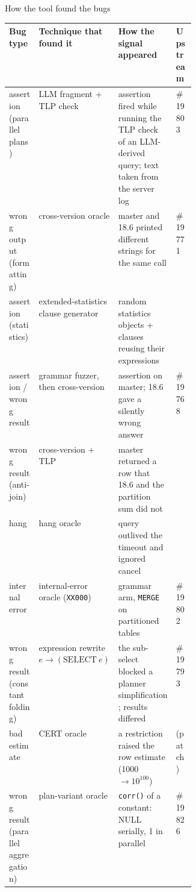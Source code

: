 \documentclass[aspectratio=169,10pt]{beamer}
\begin{document}
\begin{frame}{How the tool found the \pg bugs}
\scriptsize
\begin{tabularx}{\linewidth}{@{}L{0.16\linewidth}L{0.2\linewidth}Yl@{}}
\toprule
Bug type & Technique that found it & How the signal appeared & Upstream \\
\midrule
assertion (parallel plans) & LLM fragment + TLP check & assertion fired while running the TLP check of an LLM-derived query; text taken from the server log &  \#19803 \\
wrong output (formatting) & cross-version oracle & master and 18.6 printed different strings for the same call &  \#19771 \\
assertion (statistics) & extended-statistics clause generator & random statistics objects + clauses reusing their expressions &  \\
assertion / wrong result & grammar fuzzer, then cross-version & assertion on master; 18.6 gave a silently wrong answer &  \#19768 \\
wrong result (anti-join) & cross-version + TLP & master returned a row that 18.6 and the partition sum did not &  \\
hang & hang oracle & query outlived the timeout and ignored cancel &  \\
internal error & internal-error oracle (\texttt{XX000}) & grammar arm, \texttt{MERGE} on partitioned tables &  \#19802 \\
wrong result (constant folding) & expression rewrite $e\rightarrow(\mathrm{SELECT}\ e)$ & the sub-select blocked a planner simplification; results differed &  \#19793 \\
bad estimate & CERT oracle & a restriction raised the row estimate (1000 $\rightarrow 10^{100}$) &  (patch) \\
wrong result (parallel aggregation) & plan-variant oracle & \texttt{corr()} of a constant: NULL serially, 1 in parallel &  \#19826 \\
\bottomrule
\end{tabularx}
\end{frame}
\end{document}
